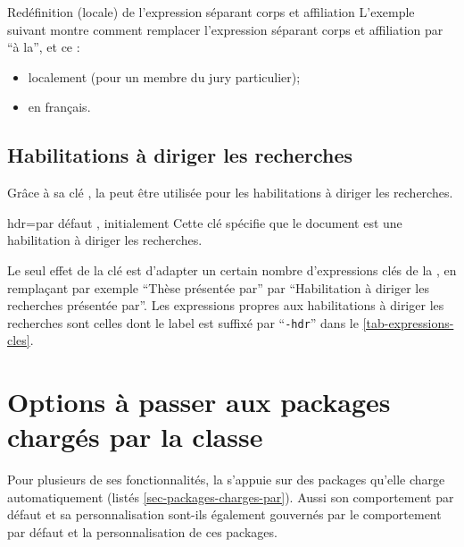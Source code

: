 \begin{dbexample}{Redéfinition (locale) de l'expression séparant corps et
    affiliation}{}
  L'exemple suivant montre comment remplacer l'expression séparant corps et
  affiliation par \enquote{\textvisiblespace{}à la\textvisiblespace{}}, et ce :
  \begin{itemize}
  \item localement (pour un membre du jury particulier);
  \item en français.
  \end{itemize}
\begin{bodycode}[listing options={showspaces}]
\end{bodycode}
\end{dbexample}

\subsection{Habilitations à diriger les recherches}
\label{sec-hdr}
%
Grâce à sa clé , la \yatCl{} peut être utilisée pour
les habilitations à diriger les recherches.

\begin{docKey}{hdr}{=\textbar{}}{par défaut
    , initialement }
  Cette clé spécifie que le document est une habilitation à diriger les
  recherches.
\end{docKey}

Le seul effet de la clé  est d'adapter un certain nombre
d'expressions clés de la \yatCl{}, en remplaçant par exemple \enquote{Thèse
  présentée par} par \enquote{Habilitation à diriger les recherches présentée
  par}. Les expressions propres aux habilitations à diriger les recherches sont
celles dont le label est suffixé par \enquote{\texttt{-hdr}} dans le
\vref{tab-expressions-cles}.

\section{Options à passer aux packages chargés par la classe}
\label{sec-options-passer-aux}

Pour plusieurs de ses fonctionnalités, la \yatCl s'appuie sur des packages
qu'elle charge automatiquement (listés
\vref{sec-packages-charges-par}). Aussi son comportement par défaut et sa
personnalisation sont-ils également gouvernés par le comportement par défaut et
la personnalisation de ces packages.

